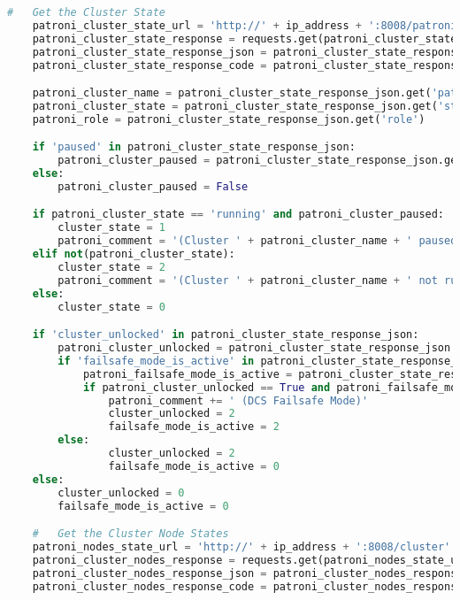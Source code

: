 \begin{flushleft}
\begin{lstlisting}[language=python, caption=Monitoring - KSGR - Patroni - Healthcheck.py,captionpos=b,label={lst:monitoring-python},breaklines=true]
    #   Get the Cluster State
    patroni_cluster_state_url = 'http://' + ip_address + ':8008/patroni'
    patroni_cluster_state_response = requests.get(patroni_cluster_state_url)
    patroni_cluster_state_response_json = patroni_cluster_state_response.json()
    patroni_cluster_state_response_code = patroni_cluster_state_response.status_code

    patroni_cluster_name = patroni_cluster_state_response_json.get('patroni').get('name')
    patroni_cluster_state = patroni_cluster_state_response_json.get('state')
    patroni_role = patroni_cluster_state_response_json.get('role')

    if 'paused' in patroni_cluster_state_response_json:
        patroni_cluster_paused = patroni_cluster_state_response_json.get('paused')
    else:
        patroni_cluster_paused = False

    if patroni_cluster_state == 'running' and patroni_cluster_paused:
        cluster_state = 1
        patroni_comment = '(Cluster ' + patroni_cluster_name + ' paused)'
    elif not(patroni_cluster_state):
        cluster_state = 2
        patroni_comment = '(Cluster ' + patroni_cluster_name + ' not running)'
    else:
        cluster_state = 0

    if 'cluster_unlocked' in patroni_cluster_state_response_json:
        patroni_cluster_unlocked = patroni_cluster_state_response_json.get('cluster_unlocked')
        if 'failsafe_mode_is_active' in patroni_cluster_state_response_json:
            patroni_failsafe_mode_is_active = patroni_cluster_state_response_json.get('failsafe_mode_is_active')
            if patroni_cluster_unlocked == True and patroni_failsafe_mode_is_active == True:
                patroni_comment += ' (DCS Failsafe Mode)'
                cluster_unlocked = 2
                failsafe_mode_is_active = 2
        else:
                cluster_unlocked = 2
                failsafe_mode_is_active = 0
    else:
        cluster_unlocked = 0
        failsafe_mode_is_active = 0

    #   Get the Cluster Node States
    patroni_nodes_state_url = 'http://' + ip_address + ':8008/cluster'
    patroni_cluster_nodes_response = requests.get(patroni_nodes_state_url)
    patroni_cluster_nodes_response_json = patroni_cluster_nodes_response.json()
    patroni_cluster_nodes_response_code = patroni_cluster_nodes_response.status_code


\end{lstlisting}
\end{flushleft}
